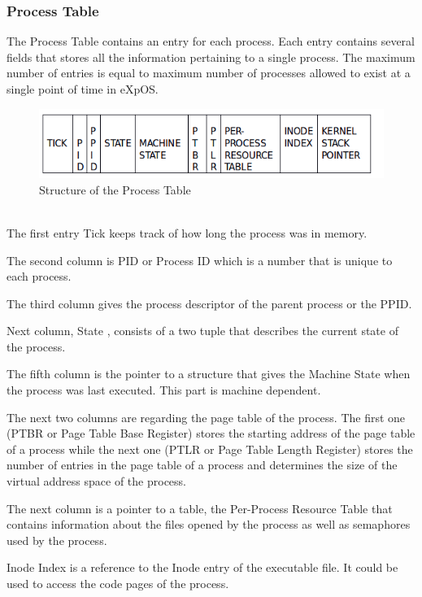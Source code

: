 \documentclass[10pt]{article}
\begin{document}
\subsubsection{Process Table}

The Process Table contains an entry for each process.  Each entry contains several fields that stores all the information pertaining to a single process. The maximum number of entries is equal to maximum number of processes allowed to exist at a single point of time in eXpOS.
\begin{figure}[ht]
\centering
\includegraphics[scale=0.50]{Process_table.png}
\caption{\footnotesize Structure of the Process Table}
\label{fig_2}
\end{figure}
\\

The first entry Tick keeps track of how long the process was in memory.

The second column is PID or Process ID which is a number that is unique to each process.

The third column gives the process descriptor of the parent process or the PPID.

Next column, State , consists of a two tuple that describes the current state of the process.

The fifth column is the pointer to a structure that gives the Machine State when the process was last executed.  This part is machine dependent. 

The next two columns are regarding the page table of the process. The first one (PTBR or Page Table Base Register) stores the starting address of the page table of a process while the next one (PTLR or Page Table Length Register) stores the number of entries in the page table of a process and determines the size of the virtual address space of the process.

The next column is a pointer to a table, the Per-Process Resource Table that contains information about the files opened by the process as well as semaphores used by the process.

Inode Index is a reference to the Inode entry of the executable file. It could be used to access the code pages of the process.
\end{document}

